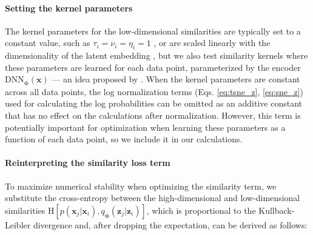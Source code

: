 \documentclass[11pt,a4paper,oneside]{book}
\begin{document}
\begin{doublespace}
\begin{appendices}
\paragraph{Setting the kernel parameters} The kernel parameters for the low-dimensional similarities are typically set to a constant value, such as $\tau_i = \nu_i = \eta_i = 1$ \citep{maaten2008tsne}, or are scaled linearly with the dimensionality of the latent embedding \citep{van2009ptsne}, but we also test similarity kernels where these parameters are learned for each data point, parameterized by the encoder $\mathrm{DNN}_{\boldsymbol{\phi}}(\mathbf{x})$ --- an idea proposed by \cite{van2009ptsne}. When the kernel parameters are constant across all data points, the log normalization terms (Eqs. \ref{eq:tsne_z}, \ref{eq:sne_z}) used for calculating the log probabilities can be omitted as an additive constant that has no effect on the calculations after normalization. However, this term is potentially important for optimization when learning these parameters as a function of each data point, so we include it in our calculations.

\paragraph{Reinterpreting the similarity loss term} To maximize numerical stability when optimizing the similarity term, we substitute the cross-entropy between the high-dimensional and low-dimensional similarities $\mathrm{H}[p(\mathbf{x}_j | \mathbf{x}_i), q_{\boldsymbol{\phi}}(\mathbf{z}_j | \mathbf{z}_i)]$, which is proportional to the Kullback-Leibler divergence and, after dropping the expectation, can be derived as follows:


\end{appendices}
\end{doublespace}
\end{document}
